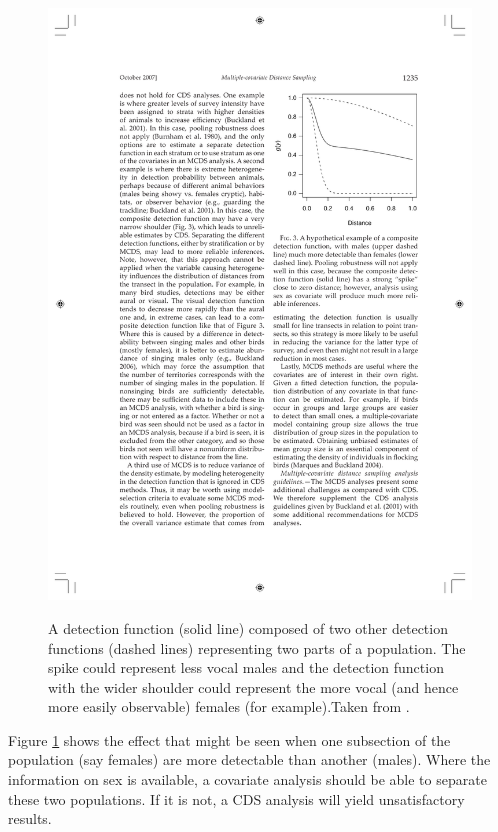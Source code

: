 \begin{figure}
\centering
\includegraphics{intro/figs/malefemale-detfct.pdf}\\
\caption{A detection function (solid line) composed of two other detection functions (dashed lines) representing two parts of a population. The spike could represent less vocal males and the detection function with the wider shoulder could represent the more vocal (and hence more easily observable) females (for example).Taken from \cite{amakihi}.}
\label{ds-malefemale-detfct}
\end{figure}

Figure \ref{ds-malefemale-detfct} shows the effect that might be seen when one subsection of the population (say females) are more detectable than another (males). Where the information on sex is available, a covariate analysis should be able to separate these two populations. If it is not, a CDS analysis will yield unsatisfactory results.

